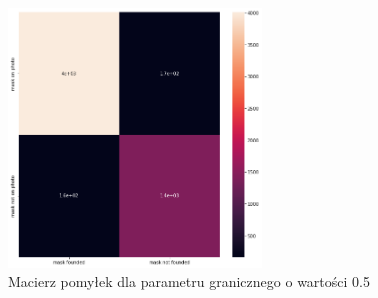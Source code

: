 \documentclass[12pt]{article}
\begin{document}
	\begin{figure}[H]
		\centering
		\includegraphics[width=0.6\textwidth]{conf.png}
		\caption{Macierz pomyłek dla parametru granicznego o wartości 0.5}
		\label{fig:conf}
	\end{figure}
	\newpage
	
\end{document}
